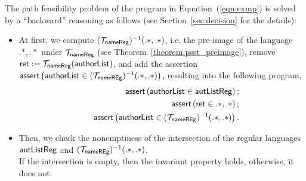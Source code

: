 The path feasibility problem of the program in Equation~(\ref{eqn:exmp}) is solved by a ``backward'' reasoning as follows (see Section~\ref{sec:decision} for the details):  
\begin{itemize}
\item At first, we compute $(\mathcal{T}_{\sf nameReg})^{-1}(.*,.*)$,  i.e. the pre-image of the language $.*,.*$ under $\mathcal{T}_{\sf nameReg}$ (see Theorem~\ref{theorem:psst_preimage}),  remove  $\sf  ret  := \sf  \mathcal{T}_{nameReg}(authorList)$, and add the assertion $\textsf{assert}\left(\sf authorList \in (\mathcal{T}_{\sf nameREg})^{-1}(.*,.*)\right)$, resulting into the following program,
\begin{eqnarray}\label{eqn:exmp}
& & \textsf{assert}\left(\sf authorList \in autListReg\right);\nonumber \\
& &  \textsf{assert}\left(\sf ret \in .*,.*\right); \nonumber \\
& & \textsf{assert}\left(\sf authorList \in (\mathcal{T}_{\sf nameREg})^{-1}(.*,.*)\right).
\end{eqnarray}

%
\item Then, we check the nonemptiness of the intersection of the regular languages $\sf autListReg$ and $(\mathcal{T}_{\sf nameREg})^{-1}(.*,.*)$.\\
If the intersection is empty, then the invariant property holds, otherwise, it does not.
\end{itemize}

